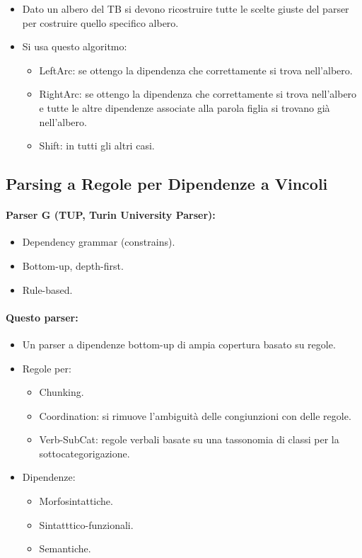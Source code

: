 \begin{itemize}
  \item Dato un albero del TB si devono ricostruire tutte le scelte giuste del parser per costruire quello specifico albero. 
  \item Si usa questo algoritmo: 
    \begin{itemize}
      \item LeftArc: se ottengo la dipendenza che correttamente si trova nell'albero. 
      \item RightArc: se ottengo la dipendenza che correttamente si trova nell'albero e tutte le altre dipendenze associate alla parola figlia si trovano già nell'albero. 
      \item Shift: in tutti gli altri casi.
    \end{itemize}
\end{itemize}

\subsection{Parsing a Regole per Dipendenze a Vincoli}

\paragraph{Parser G (TUP, Turin University Parser):}

\begin{itemize}
  \item Dependency grammar (constrains). 
  \item Bottom-up, depth-first. 
  \item Rule-based.
\end{itemize}

\paragraph{Questo parser:}

\begin{itemize}
  \item Un parser a dipendenze bottom-up di ampia
copertura basato su regole. 
\item Regole per:
  \begin{itemize}
    \item Chunking. 
    \item Coordination: si rimuove l'ambiguità delle congiunzioni con delle regole. 
    \item Verb-SubCat: regole verbali basate su una tassonomia di classi per la sottocategorigazione.
  \end{itemize} 
\item Dipendenze: 
  \begin{itemize}
    \item Morfosintattiche. 
    \item Sintatttico-funzionali. 
    \item Semantiche.
  \end{itemize}
\end{itemize}








